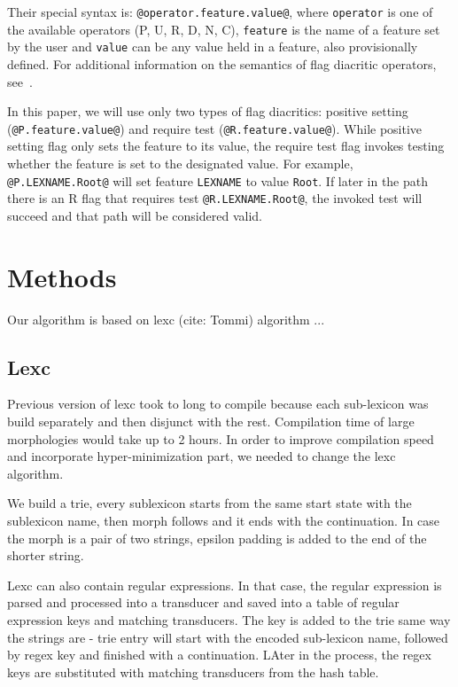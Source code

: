 \documentclass[11pt]{article}
\begin{document}
Their special syntax is: \verb+@operator.feature.value@+, where
\texttt{operator} is one of the available operators (P, U, R, D, N, C), \texttt{feature} is the name of a feature set by the user and \texttt{value} can be any value held in a feature, also provisionally defined. For additional information on the semantics of flag diacritic operators, see~.


In this paper, we will use only two types of flag diacritics: positive
setting (\verb+@P.feature.value@+) and require test
(\verb+@R.feature.value@+). While positive setting flag only sets the
feature to its value, the require test flag invokes testing whether the
feature is set to the designated value. For example,
\verb+@P.LEXNAME.Root@+ will set feature \texttt{LEXNAME} to value
\texttt{Root}. If later in the path there is an R flag that requires test
\verb+@R.LEXNAME.Root@+, the invoked test will succeed and that path
will be considered valid.



\section{Methods}
\label{sec:methods}

Our algorithm is based on lexc (cite: Tommi) algorithm ...


\subsection{Lexc}

Previous version of lexc took to long to compile because each sub-lexicon was build separately and then disjunct with the rest. Compilation time of large morphologies would take  up to 2 hours. In order to improve compilation speed and incorporate hyper-minimization part, we needed to change the lexc algorithm.

We build a trie, every sublexicon starts from the same start state with the sublexicon name, then morph follows and it ends with the continuation.
In case the morph is a pair of two strings, epsilon padding is added to the end of the shorter string.

Lexc can also contain regular expressions. In that case, the regular expression is parsed and processed into a transducer and saved into a table of regular expression keys and matching transducers. The key is added to the trie same way the strings are - trie entry will start with the encoded sub-lexicon name, followed by regex key and finished with a continuation. LAter in the process, the regex keys are substituted with matching transducers from the hash table.
\end{document}
